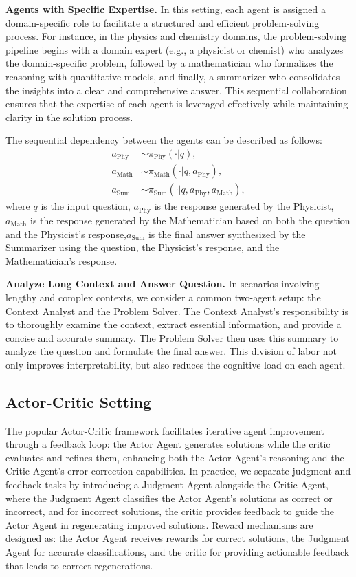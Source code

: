 \textbf{Agents with Specific Expertise.}  
In this setting, each agent is assigned a domain-specific role to facilitate a structured and efficient problem-solving process. For instance, in the physics and chemistry domains, the problem-solving pipeline begins with a domain expert (e.g., a physicist or chemist) who analyzes the domain-specific problem, followed by a mathematician who formalizes the reasoning with quantitative models, and finally, a summarizer who consolidates the insights into a clear and comprehensive answer. This sequential collaboration ensures that the expertise of each agent is leveraged effectively while maintaining clarity in the solution process.

The sequential dependency between the agents can be described as follows:
\begin{align}
    a_{\text{Phy}} &\sim \pi_{\text{Phy}}(\cdot |q), \\
    a_{\text{Math}} &\sim \pi_{\text{Math}}(\cdot |q, a_{\text{Phy}}), \\
    a_{\text{Sum}} &\sim \pi_{\text{Sum}}(\cdot |q, a_{\text{Phy}}, a_{\text{Math}}),
\end{align}
where $q $ is the input question, $a_{\text{Phy}} $ is the response generated by the Physicist, $a_{\text{Math}} $ is the response generated by the Mathematician based on both the question and the  Physicist's response,$a_{\text{Sum}} $ is the final answer synthesized by the Summarizer using the question, the  Physicist's response, and the Mathematician's response.

\textbf{Analyze Long Context and Answer Question.}  
In scenarios involving lengthy and complex contexts, we consider a common two-agent setup: the Context Analyst and the Problem Solver. The Context Analyst's responsibility is to thoroughly examine the context, extract essential information, and provide a concise and accurate summary. The Problem Solver then uses this summary to analyze the question and formulate the final answer. This division of labor not only improves interpretability, but also reduces the cognitive load on each agent.  

\subsection{Actor-Critic Setting}  
\label{sec:Actor-Critic Setting}

The popular Actor-Critic framework facilitates iterative agent improvement through a feedback loop: the Actor Agent generates solutions while the critic evaluates and refines them, enhancing both the Actor Agent's reasoning and the Critic Agent's error correction capabilities.
In practice, we separate judgment and feedback tasks by introducing a Judgment Agent alongside the Critic Agent, where the Judgment Agent classifies the Actor Agent's solutions as correct or incorrect, and for incorrect solutions, the critic provides feedback to guide the Actor Agent in regenerating improved solutions.
Reward mechanisms are designed as: the Actor Agent receives rewards for correct solutions, the Judgment Agent for accurate classifications, and the critic for providing actionable feedback that leads to correct regenerations.


